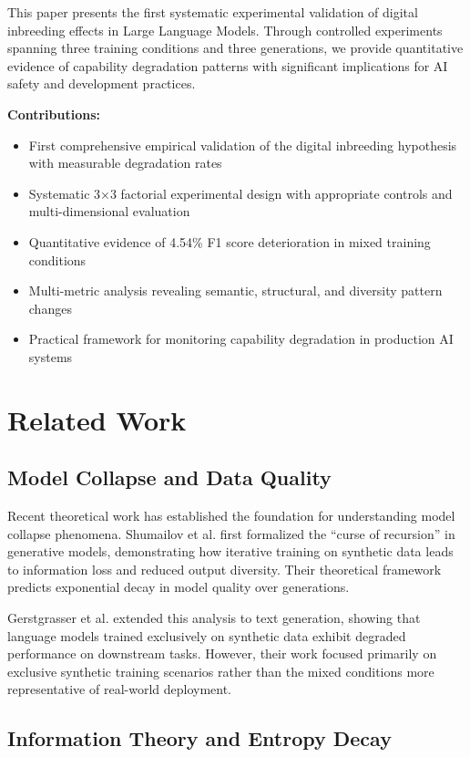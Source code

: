 \documentclass[letterpaper]{article}
\begin{document}
This paper presents the first systematic experimental validation of digital inbreeding effects in Large Language Models. Through controlled experiments spanning three training conditions and three generations, we provide quantitative evidence of capability degradation patterns with significant implications for AI safety and development practices.

\textbf{Contributions:}
\begin{itemize}
\item First comprehensive empirical validation of the digital inbreeding hypothesis with measurable degradation rates
\item Systematic 3×3 factorial experimental design with appropriate controls and multi-dimensional evaluation
\item Quantitative evidence of 4.54\% F1 score deterioration in mixed training conditions
\item Multi-metric analysis revealing semantic, structural, and diversity pattern changes
\item Practical framework for monitoring capability degradation in production AI systems
\end{itemize}

\section{Related Work}

\subsection{Model Collapse and Data Quality}

Recent theoretical work has established the foundation for understanding model collapse phenomena. Shumailov et al. \cite{shumailov2024curse} first formalized the ``curse of recursion'' in generative models, demonstrating how iterative training on synthetic data leads to information loss and reduced output diversity. Their theoretical framework predicts exponential decay in model quality over generations.

Gerstgrasser et al. \cite{gerstgrasser2024training} extended this analysis to text generation, showing that language models trained exclusively on synthetic data exhibit degraded performance on downstream tasks. However, their work focused primarily on exclusive synthetic training scenarios rather than the mixed conditions more representative of real-world deployment.

\subsection{Information Theory and Entropy Decay}
\end{document}
